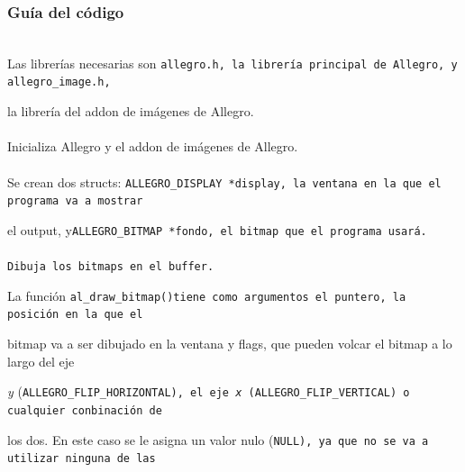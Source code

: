 \documentclass[11pt]{article}
\begin{document}
\subsubsection{Guía del código}

\\

Las librerías necesarias son \tt allegro.h\rm , la librería principal de Allegro, y \tt allegro\_image.h\rm ,

la librería del addon de imágenes de Allegro.\\

\\

Inicializa Allegro y el addon de imágenes de Allegro.\\

\\

Se crean dos structs: \tt ALLEGRO\_DISPLAY *display\rm , la ventana en la que el programa va a mostrar

el output, y\tt ALLEGRO\_BITMAP *fondo\rm , el bitmap que el programa usará.\\

\\

Dibuja los bitmaps en el buffer.

La función \tt al\_draw\_bitmap()\rm  tiene como argumentos el puntero, la posición en la que el

bitmap va a ser dibujado en la ventana y flags, que pueden volcar el bitmap a lo largo del eje

\emph{y} (\tt ALLEGRO\_FLIP\_HORIZONTAL\rm), el eje \emph{x} (\tt ALLEGRO\_FLIP\_VERTICAL\rm) o cualquier conbinación de

los dos. En este caso se le asigna un valor nulo (\tt NULL\rm ), ya que no se va a utilizar ninguna de las
\end{document}
